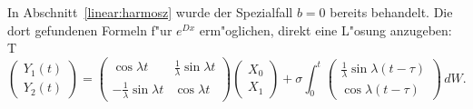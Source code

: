 In Abschnitt~\ref{linear:harmosz} wurde der Spezialfall $b=0$ bereits
behandelt.
Die dort gefundenen Formeln f"ur $e^{Dx}$ erm"oglichen, direkt eine
L"osung anzugeben:
T
\begin{equation}
\begin{pmatrix}
Y_1(t)\\Y_2(t)
\end{pmatrix}
=
\begin{pmatrix}
                \cos\lambda t&\frac1{\lambda}\sin\lambda t\\
-\frac1{\lambda}\sin\lambda t&               \cos\lambda t
\end{pmatrix}
\begin{pmatrix}X_0\\X_1\end{pmatrix}
+
\sigma\int_0^t
\begin{pmatrix}
\frac1{\lambda}\sin\lambda(t-\tau)\\
               \cos\lambda(t-\tau)
\end{pmatrix}\,dW.
\label{stochastisch:harmosz-y2}
\end{equation}
